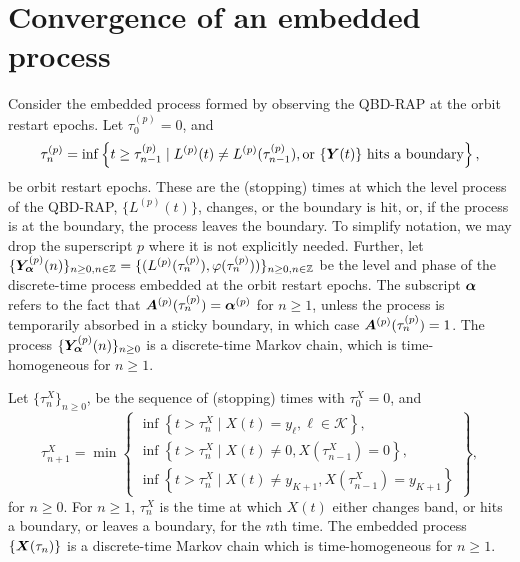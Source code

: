 
\section{Convergence of an embedded process}\label{sec: embedded}


Consider the embedded process formed by observing the QBD-RAP at the orbit restart epochs. Let \(\tau_0^{(p)}=0\), and
\[\tau_{n}^{(p)} = \inf\left\{t\geq \tau_{n-1}^{(p)} \mid L^{(p)}(t)\neq L^{(p)}(\tau_{n-1}^{(p)}), \mbox{or \(\{\boldsymbol Y(t)\}\) hits a boundary}\right\},\]
be orbit restart epochs. These are the (stopping) times at which the level process of the QBD-RAP, \(\{L^{(p)}(t)\}\), changes, or the boundary is hit, or, if the process is at the boundary, the process leaves the boundary. To simplify notation, we may drop the superscript \(p\) where it is not explicitly needed. Further, let \(\{\bm{Y}_{\bm{\alpha}}^{(p)}(n)\}_{n\geq 0, n \in \mathbb Z} = \{(L^{(p)}(\tau_n^{(p)}),\varphi(\tau_n^{(p)}))\}_{n\geq 0, n \in \mathbb Z}\) be the level and phase of the discrete-time process embedded at the orbit restart epochs. The subscript \(\boldsymbol \alpha \) refers to the fact that \(\boldsymbol A^{(p)}(\tau_n^{(p)})=\boldsymbol \alpha^{(p)}\) for \(n\geq 1\), unless the process is temporarily absorbed in a sticky boundary, in which case \(\boldsymbol A^{(p)}(\tau_n^{(p)})=1\). The process \(\{\bm{Y}_{\bm{\alpha}}^{(p)}(n)\}_{n\geq 0}\) is a discrete-time Markov chain, which is time-homogeneous for \(n\geq 1\). 

Let \(\{\tau_n^X\}_{n\geq 0}\), be the sequence of (stopping) times with \(\tau_0^X=0\), and 
\[\tau_{n+1}^X = \min\left\{\begin{array}{c}\inf\left\{t>\tau_n^X\mid X(t)=y_{\ell}, \ell\in\mathcal K\right\}, \\ \inf\left\{t>\tau_n^X \mid X(t) \neq 0, X(\tau_{n-1}^X)=0\right\}, \\ \inf\left\{t>\tau_n^X \mid X(t) \neq y_{K+1}, X(\tau_{n-1}^X)=y_{K+1}\right\} \end{array} \right\},\]
for \(n\geq 0\). For \(n\geq 1\), \(\tau_n^X\) is the time at which \(X(t)\) either changes band, or hits a boundary, or leaves a boundary, for the \(n\)th time. The embedded process \(\{\boldsymbol X(\tau_n)\}\) is a discrete-time Markov chain which is time-homogeneous for \(n\geq 1\). 

